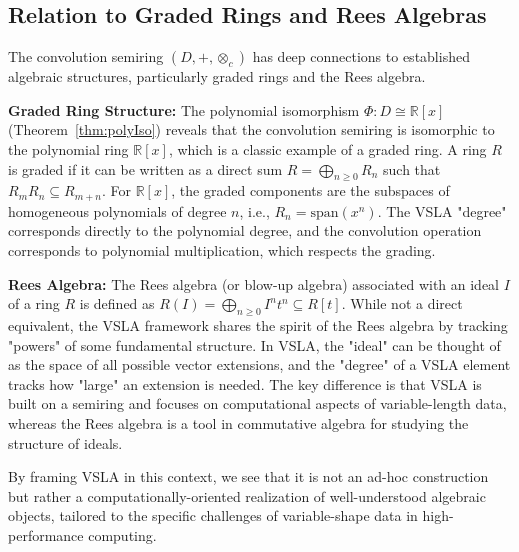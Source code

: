 \documentclass[11pt]{article}
\begin{document}
\subsection{Relation to Graded Rings and Rees Algebras}
The convolution semiring \((D, +, \otimes_c)\) has deep connections to established algebraic structures, particularly graded rings and the Rees algebra.

\textbf{Graded Ring Structure:} The polynomial isomorphism \(\Phi: D \cong \mathbb{R}[x]\) (Theorem~\ref{thm:polyIso}) reveals that the convolution semiring is isomorphic to the polynomial ring \(\mathbb{R}[x]\), which is a classic example of a graded ring. A ring \(R\) is graded if it can be written as a direct sum \(R = \bigoplus_{n \ge 0} R_n\) such that \(R_m R_n \subseteq R_{m+n}\). For \(\mathbb{R}[x]\), the graded components are the subspaces of homogeneous polynomials of degree \(n\), i.e., \(R_n = \text{span}(x^n)\). The VSLA "degree" corresponds directly to the polynomial degree, and the convolution operation corresponds to polynomial multiplication, which respects the grading.

\textbf{Rees Algebra:} The Rees algebra (or blow-up algebra) associated with an ideal \(I\) of a ring \(R\) is defined as \(R(I) = \bigoplus_{n \ge 0} I^n t^n \subseteq R[t]\). While not a direct equivalent, the VSLA framework shares the spirit of the Rees algebra by tracking "powers" of some fundamental structure. In VSLA, the "ideal" can be thought of as the space of all possible vector extensions, and the "degree" of a VSLA element tracks how "large" an extension is needed. The key difference is that VSLA is built on a semiring and focuses on computational aspects of variable-length data, whereas the Rees algebra is a tool in commutative algebra for studying the structure of ideals.

By framing VSLA in this context, we see that it is not an ad-hoc construction but rather a computationally-oriented realization of well-understood algebraic objects, tailored to the specific challenges of variable-shape data in high-performance computing.
\end{document}
